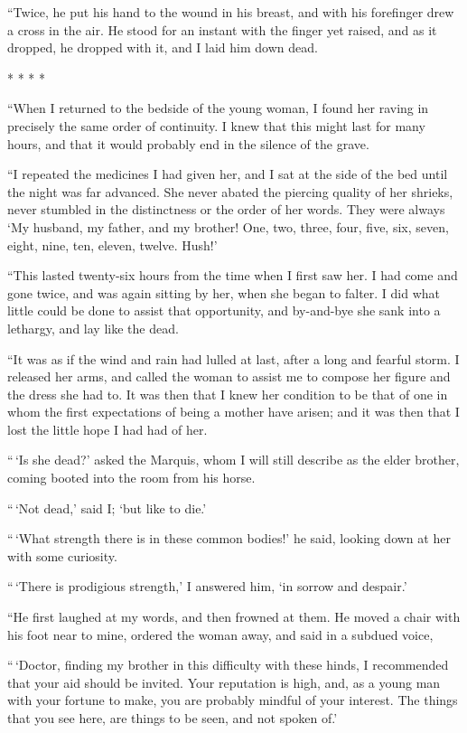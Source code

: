 ``Twice, he put his hand to the wound in his breast, and with his
forefinger drew a cross in the air.  He stood for an instant with the
finger yet raised, and as it dropped, he dropped with it, and I laid
him down dead.

* * * *

``When I returned to the bedside of the young woman, I found her
raving in precisely the same order of continuity.  I knew that this
might last for many hours, and that it would probably end in the
silence of the grave.

``I repeated the medicines I had given her, and I sat at the side of
the bed until the night was far advanced.  She never abated the
piercing quality of her shrieks, never stumbled in the distinctness
or the order of her words.  They were always `My husband, my father,
and my brother!  One, two, three, four, five, six, seven, eight, nine,
ten, eleven, twelve. Hush!'

``This lasted twenty-six hours from the time when I first saw her.  I
had come and gone twice, and was again sitting by her, when she began
to falter.  I did what little could be done to assist that opportunity,
and by-and-bye she sank into a lethargy, and lay like the dead.

``It was as if the wind and rain had lulled at last, after a long and
fearful storm.  I released her arms, and called the woman to assist
me to compose her figure and the dress she had to.  It was then that
I knew her condition to be that of one in whom the first expectations
of being a mother have arisen; and it was then that I lost the little
hope I had had of her.

``\,`Is she dead?' asked the Marquis, whom I will still describe as the
elder brother, coming booted into the room from his horse.

``\,`Not dead,' said I; `but like to die.'

``\,`What strength there is in these common bodies!' he said, looking
down at her with some curiosity.

``\,`There is prodigious strength,' I answered him, `in sorrow and despair.'

``He first laughed at my words, and then frowned at them.  He moved a
chair with his foot near to mine, ordered the woman away, and said in
a subdued voice,

``\,`Doctor, finding my brother in this difficulty with these hinds,
I recommended that your aid should be invited.  Your reputation is
high, and, as a young man with your fortune to make, you are probably
mindful of your interest.  The things that you see here, are things
to be seen, and not spoken of.'


